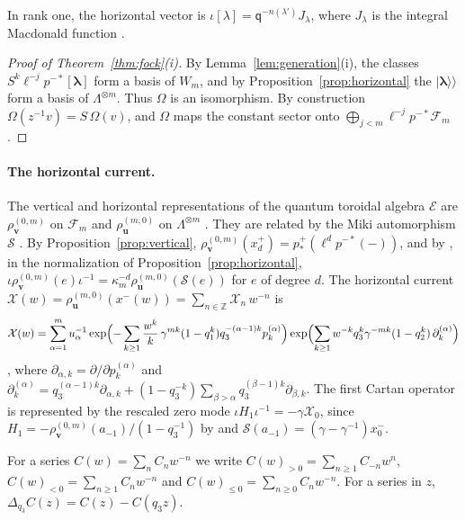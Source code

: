 \documentclass[11pt]{amsart}
\theoremstyle{definition}
\theoremstyle{remark}
\newcommand{\Mq}{\mathsf q}                      %
\newcommand{\bv}{{\mathbf v}}                    %
\newcommand{\La}{\Lambda}                        %
\newcommand{\bl}{{\boldsymbol{\lambda}}}         %
\newcommand{\Cartan}[1]{H_{#1}}                  %
\newcommand{\Fock}[1]{\mathcal F_{#1}}            %
\newcommand{\Wsp}[1]{W_{#1}}                     %
\newcommand{\kket}[1]{\lvert #1\rangle\!\rangle} %
\newcommand{\fix}[1]{[#1]}                       %
\newcommand{\taut}{\ell}                         %
\newcommand{\pulm}{p^{-*}}                       %
\newcommand{\pushp}{p^+_*}                       %
\newcommand{\Shift}{S}                           %
\newcommand{\Omap}{\Omega}                       %
\newcommand{\xplus}[1]{x^+_{#1}}                 %
\newcommand{\bu}{{\mathbf u}}                    %
\newcommand{\pk}[2]{p_{#1}^{(#2)}}               %
\newcommand{\Hiso}{\iota}                        %
\newcommand{\kappam}[1]{\kappa_{#1}}             %
\newcommand{\Dq}{\Delta_{q_3}}                   %
\newcommand{\rhov}{\rho^{(0,m)}_{\bv}}           %
\newcommand{\rhou}{\rho^{(m,0)}_{\bu}}           %
\newcommand{\Miki}{\mathcal S}                   %
\newcommand{\Xcur}{\mathcal X}                   %
\begin{document}
In rank one, the horizontal vector is
\(\Hiso\fix{\lambda}=\Mq^{-n(\lambda')}J_\lambda\), where \(J_\lambda\) is the
integral Macdonald function \cite{Macdonald}.

\begin{proof}[Proof of Theorem~\ref{thm:fock}(i)]
By Lemma~\ref{lem:generation}(i), the classes \(\Shift^k\taut^{-j}\pulm\fix{\bl}\) form a basis of
\(\Wsp{m}\), and by Proposition~\ref{prop:horizontal} the \(\kket{\bl}\) form a basis of
\(\La^{\otimes m}\). Thus \(\Omap\) is an isomorphism. By construction
\(\Omap(z^{-1}v)=\Shift\,\Omap(v)\), and \(\Omap\) maps the constant sector
onto \(\bigoplus_{j<m}\taut^{-j}\pulm\Fock{m}\).
\end{proof}

\paragraph{The horizontal current.}
The vertical and horizontal representations of the quantum toroidal algebra \(\mathcal E\) are
\(\rhov\) on \(\Fock{m}\) and \(\rhou\) on \(\La^{\otimes m}\)
\cite[Section~2.2]{BCS}. They are related by the Miki automorphism \(\Miki\)
\cite[(2.9)]{BCS}. By Proposition~\ref{prop:vertical},
\(\rhov(\xplus{d})=\pushp(\taut^d\pulm(-))\), and by \cite[(2.22) and Section~3.3]{BCS}, in the
normalization of Proposition~\ref{prop:horizontal},
\(\Hiso\rhov(e)\Hiso^{-1}=\kappam{m}^{-d}\rhou(\Miki(e))\) for \(e\) of degree \(d\). The horizontal
current \(\Xcur(w)=\rhou(x^-(w))=\sum_{n\in\mathbb Z}\Xcur_n\,w^{-n}\) is
\begin{equation}\label{eq:Xcur}
 \Xcur(w)=\sum_{\alpha=1}^mu_\alpha^{-1}
 \exp\Bigl(-\sum_{k\geq1}\frac{w^k}{k}\,\gamma^{mk}(1-q_1^k)q_3^{-(\alpha-1)k}\pk{k}{\alpha}\Bigr)
 \exp\Bigl(\sum_{k\geq1}w^{-k}q_3^k\gamma^{-mk}(1-q_2^k)\,\partial^{(\alpha)}_k\Bigr)
\end{equation}
\cite[(2.52)]{BCS}, where \(\partial_{\alpha,k}=\partial/\partial\pk{k}{\alpha}\) and
\(\partial^{(\alpha)}_k=q_3^{(\alpha-1)k}\partial_{\alpha,k}
+(1-q_3^{-k})\sum_{\beta>\alpha}q_3^{(\beta-1)k}\partial_{\beta,k}\).
The first Cartan operator is represented by the rescaled zero mode
\(\Hiso\Cartan{1}\Hiso^{-1}=-\gamma\Xcur_0\), since
\(\Cartan{1}=-\rhov(a_{-1})/(1-q_3^{-1})\) by \cite[(2.24)]{BCS} and
\(\Miki(a_{-1})=(\gamma-\gamma^{-1})x^-_0\).

For a series \(C(w)=\sum_nC_nw^{-n}\) we
write \(C(w)_{>0}=\sum_{n\geq1}C_{-n}w^n\), \(C(w)_{<0}=\sum_{n\geq1}C_nw^{-n}\) and
\(C(w)_{\leq0}=\sum_{n\geq0}C_nw^{-n}\). For a series in \(z\), \(\Dq C(z)=C(z)-C(q_3z)\).
\end{document}
